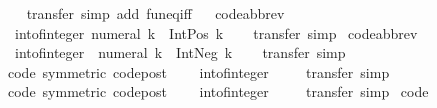 \begin{isabellebody}
%
\isadelimproof
\ \ %
\endisadelimproof
%
\isatagproof
{}\isamarkupfalse%
\ transfer\ {\isacharparenleft}simp\ add{\isacharcolon}\ fun{\isacharunderscore}eq{\isacharunderscore}iff{\isacharparenright}%
\endisatagproof
{\isafoldproof}%
%
\isadelimproof
\ \isanewline
%
\endisadelimproof
\isanewline
{}\isamarkupfalse%
\ {\isacharbrackleft}code{\isacharunderscore}abbrev{\isacharbrackright}{\isacharcolon}\isanewline
\ \ {\isachardoublequoteopen}int{\isacharunderscore}of{\isacharunderscore}integer\ {\isacharparenleft}numeral\ k{\isacharparenright}\ {\isacharequal}\ Int{\isachardot}Pos\ k{\isachardoublequoteclose}\isanewline
%
\isadelimproof
\ \ %
\endisadelimproof
%
\isatagproof
{}\isamarkupfalse%
\ transfer\ simp%
\endisatagproof
{\isafoldproof}%
%
\isadelimproof
\isanewline
%
\endisadelimproof
\isanewline
{}\isamarkupfalse%
\ {\isacharbrackleft}code{\isacharunderscore}abbrev{\isacharbrackright}{\isacharcolon}\isanewline
\ \ {\isachardoublequoteopen}int{\isacharunderscore}of{\isacharunderscore}integer\ {\isacharparenleft}{\isacharminus}\ numeral\ k{\isacharparenright}\ {\isacharequal}\ Int{\isachardot}Neg\ k{\isachardoublequoteclose}\isanewline
%
\isadelimproof
\ \ %
\endisadelimproof
%
\isatagproof
{}\isamarkupfalse%
\ transfer\ simp%
\endisatagproof
{\isafoldproof}%
%
\isadelimproof
\isanewline
%
\endisadelimproof
\ \ \isanewline
{}\isamarkupfalse%
\ {\isacharbrackleft}code{\isacharcomma}\ symmetric{\isacharcomma}\ code{\isacharunderscore}post{\isacharbrackright}{\isacharcolon}\isanewline
\ \ {\isachardoublequoteopen}{}\ {\isacharequal}\ int{\isacharunderscore}of{\isacharunderscore}integer\ {}{\isachardoublequoteclose}\isanewline
%
\isadelimproof
\ \ %
\endisadelimproof
%
\isatagproof
{}\isamarkupfalse%
\ transfer\ simp%
\endisatagproof
{\isafoldproof}%
%
\isadelimproof
\isanewline
%
\endisadelimproof
\isanewline
{}\isamarkupfalse%
\ {\isacharbrackleft}code{\isacharcomma}\ symmetric{\isacharcomma}\ code{\isacharunderscore}post{\isacharbrackright}{\isacharcolon}\isanewline
\ \ {\isachardoublequoteopen}{}\ {\isacharequal}\ int{\isacharunderscore}of{\isacharunderscore}integer\ {}{\isachardoublequoteclose}\isanewline
%
\isadelimproof
\ \ %
\endisadelimproof
%
\isatagproof
{}\isamarkupfalse%
\ transfer\ simp%
\endisatagproof
{\isafoldproof}%
%
\isadelimproof
\isanewline
%
\endisadelimproof
\isanewline
{}\isamarkupfalse%
\ {\isacharbrackleft}code{\isacharbrackright}{\isacharcolon}\isanewline

\end{isabellebody}
